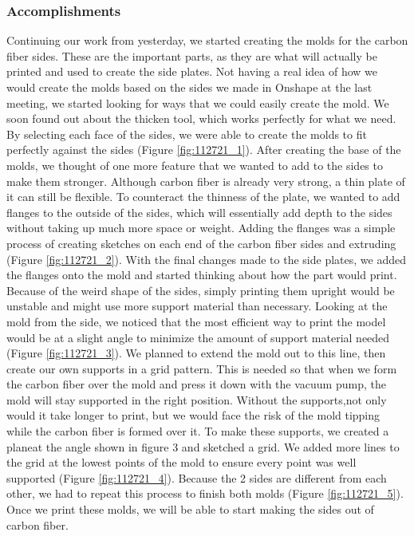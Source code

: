 \subsubsection*{Accomplishments}
Continuing our work from yesterday, we started creating the molds for the carbon fiber sides. These are the important parts, as they are what will actually be printed and used to create the side plates. Not having a real idea of how we would create the molds based on the sides we made in Onshape at the last meeting, we started looking for ways that we could easily create the mold. We soon found out about the thicken tool, which works perfectly for what we need. By selecting each face of the sides, we were able to create the molds to fit perfectly against the sides (Figure \ref{fig:112721_1}). After creating the base of the molds, we thought of one more feature that we wanted to add to the sides to make them stronger.  Although carbon fiber is already very strong, a thin plate of it can still be flexible. To counteract the thinness of the plate, we wanted to add flanges to the outside of the sides, which will essentially add depth to the sides without taking up much more space or weight. Adding the flanges was a simple process of creating sketches on each end of the carbon fiber sides and extruding (Figure \ref{fig:112721_2}). 
With the final changes made to the side plates, we added the flanges onto the mold and started thinking about how the part would print. Because of the weird shape of the sides, simply printing them upright would be unstable and might use more support material than necessary. Looking at the mold from the side, we noticed that the most efficient way to  print the model would be at a slight angle to minimize the amount of support material needed (Figure \ref{fig:112721_3}). We planned to extend the mold out to this line, then create our own supports in a grid pattern. This is needed so that when we form the carbon fiber over the mold and press it down with the vacuum pump, the mold will stay supported in the right position. Without the supports,not only would it take longer to print, but we would face the risk of the mold tipping while the carbon fiber is formed over it. To make these supports, we created a planeat the angle shown in figure 3 and sketched a grid. We added more lines to the grid at the lowest points of the mold to ensure every point was well supported (Figure \ref{fig:112721_4}). Because the 2 sides are different from each other, we had to repeat this process to finish both molds (Figure \ref{fig:112721_5}). Once we print these molds, we will be able to start making the sides out of carbon fiber.

